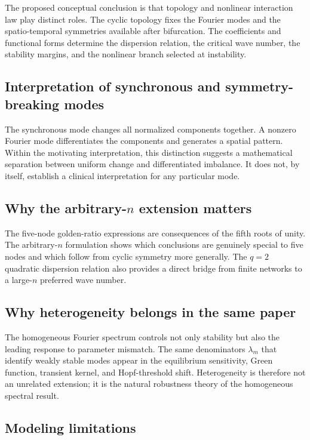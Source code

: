 \documentclass[11pt, reqno]{amsart}
\theoremstyle{definition}
\theoremstyle{remark}
\begin{document}
The proposed conceptual conclusion is that topology and nonlinear interaction
law play distinct roles.  The cyclic topology fixes the Fourier modes and the
spatio-temporal symmetries available after bifurcation.  The coefficients and
functional forms determine the dispersion relation, the critical wave number,
the stability margins, and the nonlinear branch selected at instability.

\subsection{Interpretation of synchronous and symmetry-breaking modes}

The synchronous mode changes all normalized components together.  A nonzero
Fourier mode differentiates the components and generates a spatial pattern.
Within the motivating interpretation, this distinction suggests a mathematical
separation between uniform change and differentiated imbalance.  It does not,
by itself, establish a clinical interpretation for any particular mode.

\subsection{Why the arbitrary-$n$ extension matters}

The five-node golden-ratio expressions are consequences of the fifth roots of
unity.  The arbitrary-$n$ formulation shows which conclusions are genuinely
special to five nodes and which follow from cyclic symmetry more generally.
The $q=2$ quadratic dispersion relation also provides a direct bridge from
finite networks to a large-$n$ preferred wave number.

\subsection{Why heterogeneity belongs in the same paper}

The homogeneous Fourier spectrum controls not only stability but also the
leading response to parameter mismatch.  The same denominators $\lambda_m$
that identify weakly stable modes appear in the equilibrium sensitivity, Green
function, transient kernel, and Hopf-threshold shift.  Heterogeneity is
therefore not an unrelated extension; it is the natural robustness theory of
the homogeneous spectral result.

\subsection{Modeling limitations}
\end{document}
